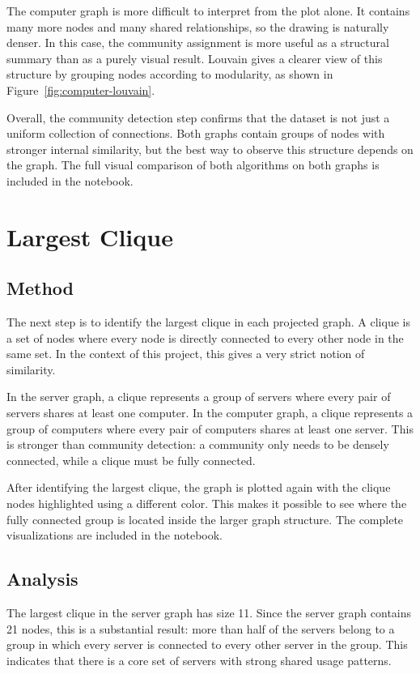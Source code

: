 \documentclass[11pt,a4paper]{article}
\begin{document}
The computer graph is more difficult to interpret from the plot alone. It contains many more nodes and many shared relationships, so the drawing is naturally denser. In this case, the community assignment is more useful as a structural summary than as a purely visual result. Louvain gives a clearer view of this structure by grouping nodes according to modularity, as shown in Figure~\ref{fig:computer-louvain}.

Overall, the community detection step confirms that the dataset is not just a uniform collection of connections. Both graphs contain groups of nodes with stronger internal similarity, but the best way to observe this structure depends on the graph. The full visual comparison of both algorithms on both graphs is included in the notebook.

\section{Largest Clique}

\subsection{Method}

The next step is to identify the largest clique in each projected graph. A clique is a set of nodes where every node is directly connected to every other node in the same set. In the context of this project, this gives a very strict notion of similarity.

In the server graph, a clique represents a group of servers where every pair of servers shares at least one computer. In the computer graph, a clique represents a group of computers where every pair of computers shares at least one server. This is stronger than community detection: a community only needs to be densely connected, while a clique must be fully connected.

After identifying the largest clique, the graph is plotted again with the clique nodes highlighted using a different color. This makes it possible to see where the fully connected group is located inside the larger graph structure. The complete visualizations are included in the notebook.

\subsection{Analysis}

The largest clique in the server graph has size 11. Since the server graph contains 21 nodes, this is a substantial result: more than half of the servers belong to a group in which every server is connected to every other server in the group. This indicates that there is a core set of servers with strong shared usage patterns.
\end{document}

